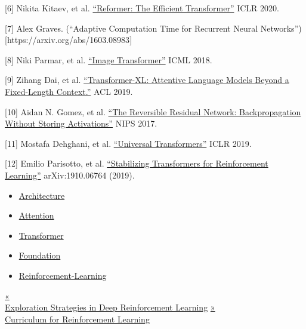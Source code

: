 {[}6{]} Nikita Kitaev, et al. \href{https://arxiv.org/abs/2001.04451}{``Reformer: The Efficient Transformer''} ICLR 2020.

{[}7{]} Alex Graves. (``Adaptive Computation Time for Recurrent Neural Networks''){[}https://arxiv.org/abs/1603.08983{]}

{[}8{]} Niki Parmar, et al. \href{https://arxiv.org/abs/1802.05751}{``Image Transformer''} ICML 2018.

{[}9{]} Zihang Dai, et al. \href{https://arxiv.org/abs/1901.02860}{``Transformer-XL: Attentive Language Models Beyond a Fixed-Length Context.''} ACL 2019.

{[}10{]} Aidan N. Gomez, et al. \href{https://arxiv.org/abs/1707.04585}{``The Reversible Residual Network: Backpropagation Without Storing Activations''} NIPS 2017.

{[}11{]} Mostafa Dehghani, et al. \href{https://arxiv.org/abs/1807.03819}{``Universal Transformers''} ICLR 2019.

{[}12{]} Emilio Parisotto, et al. \href{https://arxiv.org/abs/1910.06764}{``Stabilizing Transformers for Reinforcement Learning''} arXiv:1910.06764 (2019).

\begin{itemize}
\tightlist
\item
  \href{https://lilianweng.github.io/tags/architecture/}{Architecture}
\item
  \href{https://lilianweng.github.io/tags/attention/}{Attention}
\item
  \href{https://lilianweng.github.io/tags/transformer/}{Transformer}
\item
  \href{https://lilianweng.github.io/tags/foundation/}{Foundation}
\item
  \href{https://lilianweng.github.io/tags/reinforcement-learning/}{Reinforcement-Learning}
\end{itemize}

\href{https://lilianweng.github.io/posts/2020-06-07-exploration-drl/}{{« }\\
{Exploration Strategies in Deep Reinforcement Learning}} \href{https://lilianweng.github.io/posts/2020-01-29-curriculum-rl/}{{ »}\\
{Curriculum for Reinforcement Learning}}

